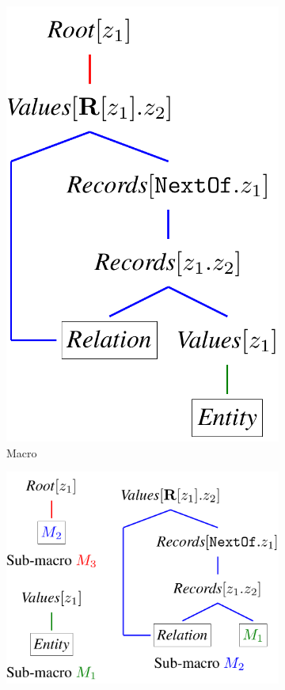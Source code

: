 \begin{figure}
\begin{subfigure}[b]{0.40\textwidth}
\includegraphics[scale=.35]{sfig/parsetrees.slides/macroParseMacro.pdf}
\caption{Macro}
\label{fig:compute-macro-b}
\end{subfigure}
\begin{subfigure}[b]{0.40\textwidth}\centering
\includegraphics[scale=.35]{sfig/parsetrees.slides/macroParseSubMacros.pdf}

\end{subfigure}
\end{figure}
